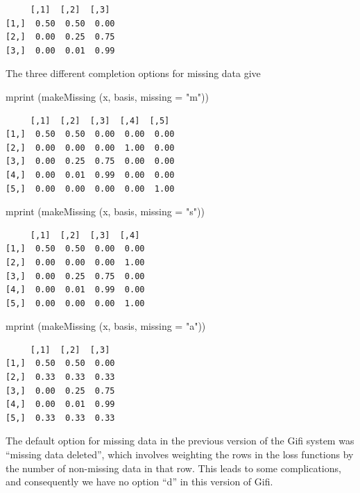 \documentclass[
  12pt,
  letterpaper,
  DIV=11,
  numbers=noendperiod]{scrreprt}
\newenvironment{Shaded}{\begin{snugshade}}{\end{snugshade}}
\newcommand{\AttributeTok}[1]{\textcolor[rgb]{0.40,0.45,0.13}{#1}}
\newcommand{\FunctionTok}[1]{\textcolor[rgb]{0.28,0.35,0.67}{#1}}
\newcommand{\NormalTok}[1]{\textcolor[rgb]{0.00,0.23,0.31}{#1}}
\newcommand{\StringTok}[1]{\textcolor[rgb]{0.13,0.47,0.30}{#1}}
\begin{document}
\begin{verbatim}
     [,1]  [,2]  [,3] 
[1,]  0.50  0.50  0.00
[2,]  0.00  0.25  0.75
[3,]  0.00  0.01  0.99
\end{verbatim}

The three different completion options for missing data give

\begin{Shaded}
\begin{Highlighting}[]
\FunctionTok{mprint}\NormalTok{ (}\FunctionTok{makeMissing}\NormalTok{ (x, basis, }\AttributeTok{missing =} \StringTok{"m"}\NormalTok{))}
\end{Highlighting}
\end{Shaded}

\begin{verbatim}
     [,1]  [,2]  [,3]  [,4]  [,5] 
[1,]  0.50  0.50  0.00  0.00  0.00
[2,]  0.00  0.00  0.00  1.00  0.00
[3,]  0.00  0.25  0.75  0.00  0.00
[4,]  0.00  0.01  0.99  0.00  0.00
[5,]  0.00  0.00  0.00  0.00  1.00
\end{verbatim}

\begin{Shaded}
\begin{Highlighting}[]
\FunctionTok{mprint}\NormalTok{ (}\FunctionTok{makeMissing}\NormalTok{ (x, basis, }\AttributeTok{missing =} \StringTok{"s"}\NormalTok{))}
\end{Highlighting}
\end{Shaded}

\begin{verbatim}
     [,1]  [,2]  [,3]  [,4] 
[1,]  0.50  0.50  0.00  0.00
[2,]  0.00  0.00  0.00  1.00
[3,]  0.00  0.25  0.75  0.00
[4,]  0.00  0.01  0.99  0.00
[5,]  0.00  0.00  0.00  1.00
\end{verbatim}

\begin{Shaded}
\begin{Highlighting}[]
\FunctionTok{mprint}\NormalTok{ (}\FunctionTok{makeMissing}\NormalTok{ (x, basis, }\AttributeTok{missing =} \StringTok{"a"}\NormalTok{))}
\end{Highlighting}
\end{Shaded}

\begin{verbatim}
     [,1]  [,2]  [,3] 
[1,]  0.50  0.50  0.00
[2,]  0.33  0.33  0.33
[3,]  0.00  0.25  0.75
[4,]  0.00  0.01  0.99
[5,]  0.33  0.33  0.33
\end{verbatim}

The default option for missing data in the previous version of the Gifi
system was ``missing data deleted'', which involves weighting the rows
in the loss functions by the number of non-missing data in that row.
This leads to some complications, and consequently we have no option
``d'' in this version of Gifi.
\end{document}
